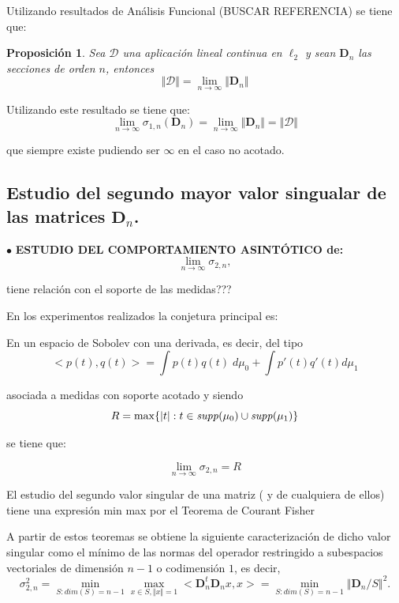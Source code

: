 \documentclass[11pt]{article}
\newtheorem{prop1}{Proposici\'{o}n}%
\newenvironment{prop}{\begin{prop1}\rm}{\end{prop1}}
\begin{document}
\bigskip Utilizando resultados de Análisis Funcional (BUSCAR REFERENCIA) se tiene que:

\begin{prop} Sea $\mathcal{D}$ una aplicación lineal continua en $\ell_2$ y sean $\mathbf{D}_n$ las secciones de orden $n$, entonces
  $$
    \Vert \mathcal{D} \Vert = \lim_{n\to \infty} \Vert \mathbf{D}_n\Vert
  $$

\end{prop}

\noindent Utilizando este resultado se tiene que:
$$
  \lim_{n\to \infty} \sigma_{1,n}(\mathbf{D}_n)= \lim_{n \to \infty} \Vert \mathbf{D}_n\Vert= \Vert \mathcal{D}\Vert
$$

\noindent que siempre existe pudiendo ser $\infty$ en el caso no acotado.

\subsection{Estudio del segundo mayor valor singualar de las matrices $\mathbf{D}_n$.}

\noindent $\bullet$ {\bf  ESTUDIO DEL COMPORTAMIENTO ASINTÓTICO de: }
$$
  \lim_{n\to \infty} \sigma_{2,n},
$$

\noindent tiene relación con el soporte de las medidas???

\noindent En los experimentos realizados la conjetura principal es:




\noindent En un espacio de Sobolev con una derivada, es decir, del tipo
$$
  <p(t),q(t)>=\int p(t)q(t)\; d\mu_0 + \int p'(t)q'(t)d\mu_1
$$

\noindent asociada a medidas con soporte acotado y siendo
$$
  R=\max \{ \vert t \vert : t\in {\it supp}(\mu_0)\cup {\it supp}(\mu_1)\}
$$


\noindent se tiene que:

$$
  \lim_{n\to \infty} \sigma_{2,n} = R
$$


\noindent El estudio del segundo valor singular de una matriz ( y de cualquiera de ellos) tiene una expresión min max por el Teorema de Courant Fisher

\noindent A partir de estos teoremas se obtiene la siguiente caracterización de dicho valor singular como el mínimo  de las normas del operador restringido a subespacios vectoriales de dimensión $n-1$ o codimensión $1$, es decir,
$$
  \sigma_{2,n}^{2} = \min_{S: dim(S)=n-1} \max_{x\in S,\Vert x\Vert=1} <\mathbf{D}_n^t\mathbf{D}_n x,x>= \min_{S: dim(S)=n-1} \Vert \mathbf{D}_n/S\Vert^2.
$$
\end{document}
